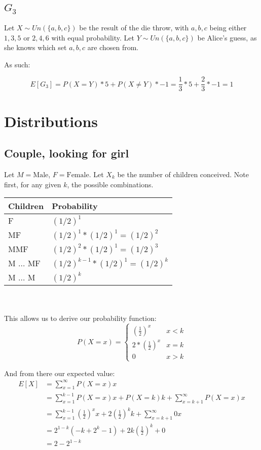 \documentclass[a4paper]{scrreprt}
\begin{document}
\subsection{$G_3$}

Let $X \sim Un(\{a, b, c\})$ be the result of the die throw, with $a, b, c$
being either $1, 3, 5$ or $2, 4, 6$ with equal probability. Let $Y \sim Un(\{a,
b, c\})$ be Alice's guess, as she knows which set $a, b, c$ are chosen from.

As such:

\[
	E[G_3] = P(X = Y) * 5 + P(X \neq Y) * -1 = \frac{1}{3} * 5 + \frac{2}{3} * -1 = 1
\]


\section{Distributions}

\subsection{Couple, looking for girl}

Let $M = \text{Male}$, $F = \text{Female}$. Let $X_k$ be the number of children
conceived. Note first, for any given $k$, the possible combinations.
\\

\begin{tabular}{|l|l|}
	\hline
	Children & Probability \\
	\hline
	$\text{F}$ & $(1/2)^1$ \\
	\hline
	$\text{MF}$ & $(1/2)^1 * (1/2)^1 = (1/2)^2$ \\
	\hline
	$\text{MMF}$ & $(1/2)^2 * (1/2)^1 = (1/2)^3$ \\
	\hline
	$\text{M \ldots\ MF}$ & $(1/2)^{k-1} * (1/2)^1 = (1/2)^k$ \\
	\hline
	$\text{M \ldots\ M}$ & $(1/2)^{k}$ \\
	\hline
\end{tabular}
\\
\\
This allows us to derive our probability function:
\[
	P(X=x) =
	\begin{cases}
		\left(\frac{1}{2}\right)^x & x < k \\
		2 * \left(\frac{1}{2}\right)^x & x = k \\
		0 & x > k
	\end{cases}
\]

And from there our expected value:
\begin{align*}
	E[X] & = \sum_{x=1}^{\infty}{P(X=x) x} \\
	& = \sum_{x=1}^{k-1}{P(X=x) x} + P(X=k) k + \sum_{x=k+1}^{\infty}{P(X=x) x} \\
	& = \sum_{x=1}^{k-1}{\left(\frac{1}{2}\right)^x x} + 2 \left(\frac{1}{2}\right)^k k + \sum_{x=k+1}^{\infty}{0 x} \\
	& = 2^{1-k} (-k +2^k -1) + 2k \left(\frac{1}{2}\right)^k + 0 \\
	& = 2 - 2^{1-k}
\end{align*}
\end{document}
